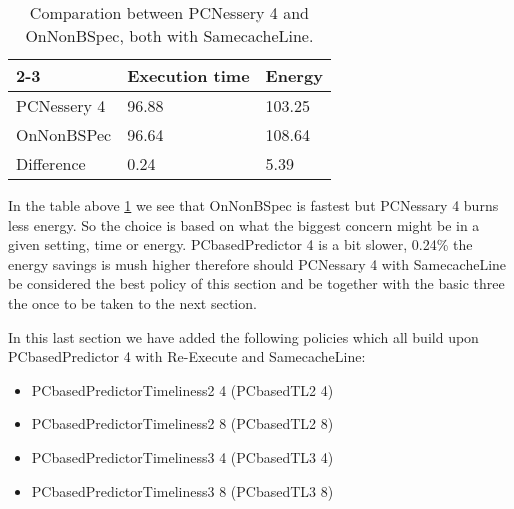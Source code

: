     \begin{table}[H]
\centering

\begin{tabular}{ |l|l|l| }
\cline{2-3}
\multicolumn{1}{ c| }{} 
& Execution time & Energy  \\  \hline
PCNessery 4& 96.88 & 103.25  \\  \hline
OnNonBSPec & 96.64 & 108.64  \\  \hline
Difference & 0.24 & 5.39  \\  \hline
\end{tabular}
\caption{Comparation between PCNessery 4 and OnNonBSpec, both with SamecacheLine. }
\label{quickcompPC4vsONBS}
\end{table}
In the table above \ref{quickcompPC4vsONBS} we see that  OnNonBSpec is fastest but PCNessary 4 burns less energy. So the choice is based on what the biggest concern might be in a given setting, time or energy. PCbasedPredictor 4 is a bit slower, 0.24\% the energy savings is mush higher therefore should PCNessary 4 with SamecacheLine be considered the best policy of this section and be together with the basic three the once to be taken to the next section. 

In this last section we have added the following policies which all build upon PCbasedPredictor 4 with Re-Execute and SamecacheLine:
\begin{itemize}
    \item PCbasedPredictorTimeliness2 4 (PCbasedTL2 4)
    \item PCbasedPredictorTimeliness2 8 (PCbasedTL2 8)
    \item PCbasedPredictorTimeliness3 4 (PCbasedTL3 4)
    \item PCbasedPredictorTimeliness3 8 (PCbasedTL3 8)
\end{itemize}
\resExtime

